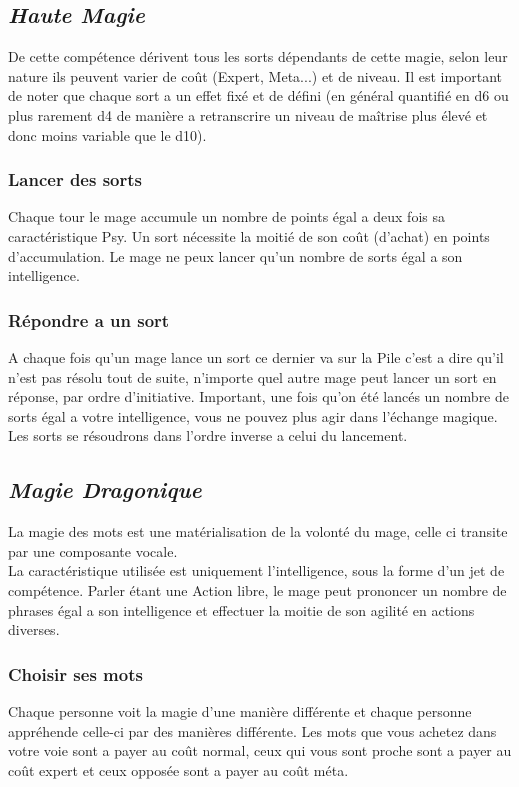 \subsection{\em Haute Magie}
De cette compétence dérivent tous les sorts dépendants de cette magie, 
selon leur nature ils peuvent varier de coût (Expert, Meta...) et de niveau. 
Il est important de noter que chaque sort a un effet fixé et de défini 
(en général quantifié en d6 ou plus rarement d4 de manière a retranscrire un niveau de maîtrise plus élevé et donc moins variable que le d10).

\subsubsection{Lancer des sorts}
Chaque tour le mage accumule un nombre de points égal a deux fois sa caractéristique Psy. 
Un sort nécessite la moitié de son coût (d’achat) en points d’accumulation. 
Le mage ne peux lancer qu’un nombre de sorts égal a son intelligence.

\subsubsection{Répondre a un sort}
A chaque fois qu’un mage lance un sort ce dernier va sur la Pile c’est a dire qu’il n’est pas résolu tout de suite, 
n'importe quel autre mage peut lancer un sort en réponse, par ordre d’initiative.
Important, une fois qu’on été lancés un nombre de sorts égal a votre intelligence, vous ne pouvez plus agir dans l'échange magique.
Les sorts se résoudrons dans l’ordre inverse a celui du lancement.

\subsection{\em Magie Dragonique}
La magie des mots est une matérialisation de la volonté du mage, celle ci transite par une composante vocale.\\
La caractéristique utilisée est uniquement l'intelligence, sous la forme d’un jet de compétence. 
Parler étant une Action libre, le mage peut prononcer un nombre de phrases égal a son intelligence et effectuer la moitie de son agilité en actions diverses.

\subsubsection{Choisir ses mots}
Chaque personne voit la magie d’une manière différente et chaque personne appréhende celle-ci par des manières différente.
Les mots que vous achetez dans votre voie sont a payer au coût normal, 
ceux qui vous sont proche sont a payer au coût expert et ceux opposée sont a payer au coût méta.
